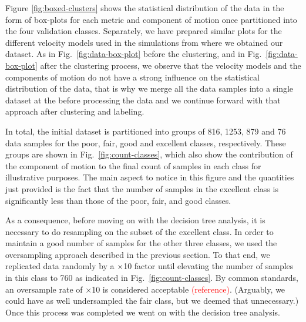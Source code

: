 Figure \ref{fig:boxed-clusters} shows the statistical distribution of the data in the form of box-plots for each metric and component of motion once partitioned into the four validation classes. Separately, we have prepared similar plots for the different velocity models used in the simulations from where we obtained our dataset. As in Fig.~\ref{fig:data-box-plot} before the clustering, and in Fig.~\ref{fig:data-box-plot} after the clustering process, we observe that the velocity models and the components of motion do not have a strong influence on the statistical distribution of the data, that is why we merge all the data samples into a single dataset at the before processing the data and we continue forward with that approach after clustering and labeling.

In total, the initial dataset is partitioned into groups of 816, 1253, 879 and 76 data samples for the poor, fair, good and excellent classes, respectively. These groups are shown in Fig.~\ref{fig:count-classes}, which also show the contribution of the component of motion to the final count of samples in each class for illustrative purposes. The main aspect to notice in this figure and the quantities just provided is the fact that the number of samples in the excellent class is significantly less than those of the poor, fair, and good classes. 

As a consequence, before moving on with the decision tree analysis, it is necessary to do resampling on the subset of the excellent class. In order to maintain a good number of samples for the other three classes, we used the oversampling approach described in the previous section. To that end, we replicated data randomly by a $\times$10 factor until elevating the number of samples in this class to 760 as indicated in Fig.~\ref{fig:count-classes}. By common standards, an oversample rate of $\times$10 is considered acceptable \textcolor{red}{(reference)}. (Arguably, we could have as well undersampled the fair class, but we deemed that unnecessary.) Once this process was completed we went on with the decision tree analysis. 

